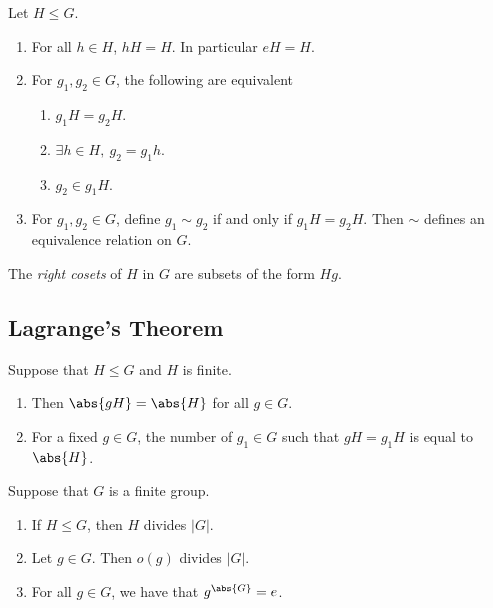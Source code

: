 \documentclass{article}
\begin{document}
\setcounter{theorem}{7}
\begin{theorem}
	Let $H\leq G$.
	\begin{enumerate}
		\item For all $h\in H$, $hH=H$. In particular $eH=H$.
		\item For $g_1,g_2\in G$, the following are equivalent \begin{enumerate}
			      \item $g_1H=g_2H$.
			      \item $\exists h\in H,\: g_2 = g_1h$.
			      \item $g_2\in g_1 H$.
		      \end{enumerate}
		\item For $g_1,g_2\in G$, define $g_1\sim g_2$ if and only if $g_1H=g_2H$.
		      Then $\sim$ defines an equivalence relation on $G$.
	\end{enumerate}
\end{theorem}

\begin{definition}
	The \emph{right cosets} of $H$ in $G$ are subsets of the form $Hg$.
\end{definition}

\subsection{Lagrange's Theorem}

\begin{lemma}
	Suppose that $H\leq G$ and $H$ is finite.
	\begin{enumerate}
		\item Then $\abs{gH}=\abs{H}$ for all $g\in G$.
		\item For a fixed $g\in G$, the number of $g_1\in G$
		      such that $gH=g_1H$ is equal to $\abs{H}$.
	\end{enumerate}
\end{lemma}

\begin{theorem}
	Suppose that $G$ is a finite group.
	\begin{enumerate}
		\item If $H\leq G$, then $H$ divides $|G|$.
		\item Let $g\in G$. Then $o(g)$ divides $|G|$.
		\item For all $g\in G$, we have that $g^{\abs{G}}=e$.
	\end{enumerate}
\end{theorem}
\end{document}
